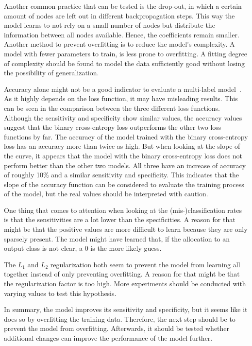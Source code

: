 Another common practice that can be tested is the drop-out, in which a certain amount of nodes are left out in different backpropagation steps. This way the model learns to not rely on a small number of nodes but distribute the information between all nodes available. Hence, the coefficients remain smaller. Another method to prevent overfitting is to reduce the model's complexity. A model with fewer parameters to train, is less prone to overfitting. A fitting degree of complexity should be found to model the data sufficiently good without losing the possibility of generalization.

Accuracy alone might not be a good indicator to evaluate a multi-label model~\citep{gibaja2015}. As it highly depends on the loss function, it may have misleading results. This can be seen in the comparison between the three different loss functions. Although the sensitivity and specificity show similar values, the accuracy values suggest that the binary cross-entropy loss outperforms the other two loss functions by far. The accuracy of the model trained with the binary cross-entropy loss has an accuracy more than twice as high. But when looking at the slope of the curve, it appears that the model with the binary cross-entropy loss does not perform better than the other two models. All three have an increase of accuracy of roughly 10\% and a similar sensitivity and specificity. This indicates that the slope of the accuracy function can be considered to evaluate the training process of the model, but the real values should be interpreted with caution.

One thing that comes to attention when looking at the (mis-)classification rates is that the sensitivities are a lot lower than the specificities. A reason for that might be that the positive values are more difficult to learn because they are only sparsely present. The model might have learned that, if the allocation to an output class is not clear, a 0 is the more likely guess.

The \(L_1\) and \(L_2\) regularization both seem to prevent the model from learning all together instead of only preventing overfitting. A reason for that might be that the regularization factor is too high. More experiments should be conducted with varying values to test this hypothesis.

\bigskip
In summary, the model improves its sensitivity and specificity, but it seems like it does so by overfitting the training data. Therefore, the next step should be to prevent the model from overfitting. Afterwards, it should be tested whether additional changes can improve the performance of the model further.


